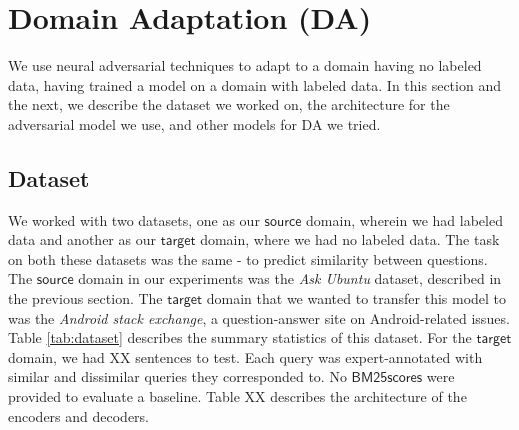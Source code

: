 \documentclass{sigkddExp}
\begin{document}
\section{Domain Adaptation (DA)}
\label{domain_adapt}
We use neural adversarial techniques\cite{ganin2015unsupervised} to adapt to a domain having no labeled data, having trained a model on a domain with labeled data. In this section and the next, we describe the dataset we worked on, the architecture for the adversarial model we use, and other models for DA we tried.


\subsection{Dataset}
We worked with two datasets, one as our $\mathsf{source}$ domain, wherein we had labeled data and another as our $\mathsf{target}$ domain, where we had no labeled data. The task on both these datasets was the same - to predict similarity between questions. The $\mathsf{source}$ domain in our experiments was the \textit{Ask Ubuntu} dataset, described in the previous section. The $\mathsf{target}$ domain that we wanted to transfer this model to was the \textit{Android stack exchange}, a question-answer site on Android-related issues. Table \ref{tab:dataset} describes the summary statistics of this dataset. For the $\mathsf{target}$ domain, we had XX sentences to test. Each query was expert-annotated with similar and dissimilar queries they corresponded to. No $\mathsf{BM25 scores}$ were provided to evaluate a baseline. Table XX describes the architecture of the encoders and decoders.
\end{document}
